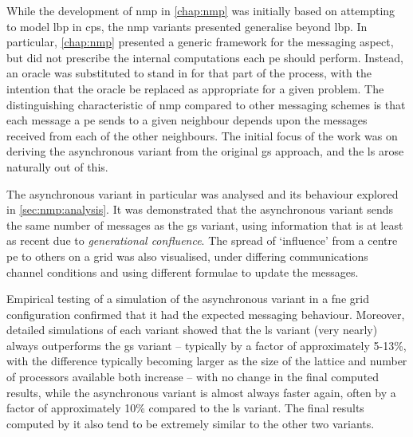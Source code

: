 While the development of \gls{nmp} in \cref{chap:nmp} was initially based on attempting to model \gls{lbp} in \gls{cps}, the \gls{nmp} variants presented generalise beyond \gls{lbp}.  In particular, \cref{chap:nmp} presented a generic framework for the messaging aspect, but did not prescribe the internal computations each \gls{pe} should perform.  Instead, an oracle was substituted to stand in for that part of the process, with the intention that the oracle be replaced as appropriate for a given problem.  The distinguishing characteristic of \gls{nmp} compared to other messaging schemes is that each message a \gls{pe} sends to a given neighbour depends upon the messages received from each of the other neighbours.  The initial focus of the work was on deriving the asynchronous variant from the original \gls{gs} approach, and the \gls{ls} arose naturally out of this.


The asynchronous variant in particular was analysed and its behaviour explored in \cref{sec:nmp:analysis}.  It was demonstrated that the asynchronous variant sends the same number of messages as the \gls{gs} variant, using information that is at least as recent due to \emph{generational confluence}.  The spread of `influence' from a centre \gls{pe} to others on a grid was also visualised, under differing communications channel conditions and using different formulae to update the messages.

Empirical testing of a simulation of the asynchronous variant in a \gls{fne} grid configuration confirmed that it had the expected messaging behaviour.  Moreover, detailed simulations of each variant showed that the \gls{ls} variant (very nearly) always outperforms the \gls{gs} variant -- typically by a factor of approximately 5-13\%, with the difference typically becoming larger as the size of the lattice and number of processors available both increase -- with no change in the final computed results, while the asynchronous variant is almost always faster again, often by a factor of approximately 10\% compared to the \gls{ls} variant.  The final results computed by it also tend to be extremely similar to the other two variants.

